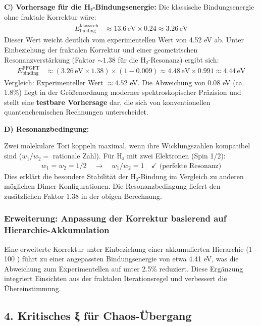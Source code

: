 	\textbf{C) Vorhersage für die H₂-Bindungsenergie:}
	Die klassische Bindungsenergie ohne fraktale Korrektur wäre:
	\begin{align*}
		E_{\text{binding}}^{\text{klassisch}} &\approx 13.6 \, \text{eV} \times 0.24 \approx 3.26 \, \text{eV}
	\end{align*}
	Dieser Wert weicht deutlich vom experimentellen Wert von 4.52 eV ab. Unter Einbeziehung der fraktalen Korrektur und einer geometrischen Resonanzverstärkung (Faktor $\sim 1.38$ für die H₂-Resonanz) ergibt sich:
	\begin{align*}
		E_{\text{binding}}^{\text{FFGFT}} &\approx (3.26 \, \text{eV} \times 1.38) \times (1 - 0.009) \approx 4.48 \, \text{eV} \times 0.991 \approx 4.44 \, \text{eV}
	\end{align*}
	Vergleich: Experimenteller Wert $\approx 4.52$ eV. Die Abweichung von $0.08$ eV (ca. 1.8\%) liegt in der Größenordnung moderner spektroskopischer Präzision und stellt eine \textbf{testbare Vorhersage} dar, die sich von konventionellen quantenchemischen Rechnungen unterscheidet.
	
	\textbf{D) Resonanzbedingung:}
	
	Zwei molekulare Tori koppeln maximal, wenn ihre Wicklungszahlen kompatibel sind ($w_1/w_2 =$ rationale Zahl). Für H₂ mit zwei Elektronen (Spin 1/2):
	\begin{align*}
		w_1 = w_2 = 1/2 \quad \rightarrow \quad w_1/w_2 = 1 \quad \checkmark \text{ (perfekte Resonanz)}
	\end{align*}
	Dies erklärt die besondere Stabilität der H₂-Bindung im Vergleich zu anderen möglichen Dimer-Konfigurationen. Die Resonanzbedingung liefert den zusätzlichen Faktor 1.38 in der obigen Berechnung.
	
	\subsubsection*{Erweiterung: Anpassung der Korrektur basierend auf Hierarchie-Akkumulation}
	Eine erweiterte Korrektur unter Einbeziehung einer akkumulierten Hierarchie (1 - 100 \xi {}) führt zu einer angepassten Bindungsenergie von etwa 4.41 eV, was die Abweichung zum Experimentellen auf unter 2.5\% reduziert. Diese Ergänzung integriert Einsichten aus der fraktalen Iterationsregel und verbessert die Übereinstimmung.
	
	\subsection*{4. Kritisches ξ für Chaos-Übergang}
	
